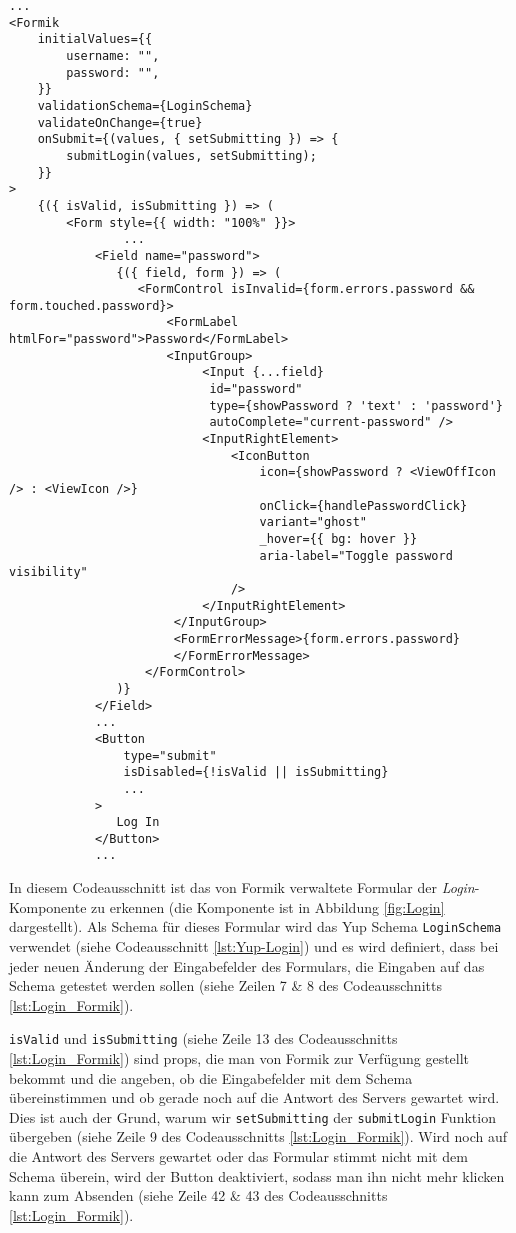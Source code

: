 \begin{lstlisting}[style=codeStyle, caption={Ein Ausschnitt der \textit{Login}-Komponente mit Formik}, label={lst:Login_Formik}]
...
<Formik
    initialValues={{
        username: "",
        password: "",
    }}
    validationSchema={LoginSchema}
    validateOnChange={true}
    onSubmit={(values, { setSubmitting }) => {
        submitLogin(values, setSubmitting);
    }}
>
    {({ isValid, isSubmitting }) => (
        <Form style={{ width: "100%" }}>
        		...
            <Field name="password">
               {({ field, form }) => (
                  <FormControl isInvalid={form.errors.password && form.touched.password}>
                      <FormLabel htmlFor="password">Password</FormLabel>
                      <InputGroup>
                           <Input {...field} 
                           	id="password" 
                           	type={showPassword ? 'text' : 'password'} 
                           	autoComplete="current-password" />
                           <InputRightElement>
                               <IconButton
                                   icon={showPassword ? <ViewOffIcon /> : <ViewIcon />}
                                   onClick={handlePasswordClick}
                                   variant="ghost"
                                   _hover={{ bg: hover }}
                                   aria-label="Toggle password visibility"
                               />
                           </InputRightElement>
                       </InputGroup>
                       <FormErrorMessage>{form.errors.password}
                       </FormErrorMessage>
                   </FormControl>
               )}
            </Field>
            ...
            <Button
                type="submit"
                isDisabled={!isValid || isSubmitting}
                ...
            >
               Log In
            </Button>
            ...
\end{lstlisting}

In diesem Codeausschnitt ist das von Formik verwaltete Formular der \textit{Login}-Komponente zu erkennen (die Komponente ist in Abbildung \ref{fig:Login} dargestellt). Als Schema für dieses Formular wird das Yup Schema \verb|LoginSchema| verwendet (siehe Codeausschnitt \ref{lst:Yup-Login}) und es wird definiert, dass bei jeder neuen Änderung der Eingabefelder des Formulars, die Eingaben auf das Schema getestet werden sollen (siehe Zeilen 7 \& 8 des Codeausschnitts \ref{lst:Login_Formik}).

\verb|isValid| und \verb|isSubmitting| (siehe Zeile 13 des Codeausschnitts \ref{lst:Login_Formik}) sind props, die man von Formik zur Verfügung gestellt bekommt und die angeben, ob die Eingabefelder mit dem Schema übereinstimmen und ob gerade noch auf die Antwort des Servers gewartet wird. Dies ist auch der Grund, warum wir \verb|setSubmitting| der \verb|submitLogin| Funktion übergeben (siehe Zeile 9 des Codeausschnitts \ref{lst:Login_Formik}). Wird noch auf die Antwort des Servers gewartet oder das Formular stimmt nicht mit dem Schema überein, wird der Button deaktiviert, sodass man ihn nicht mehr klicken kann zum Absenden (siehe Zeile 42 \& 43 des Codeausschnitts \ref{lst:Login_Formik}).

